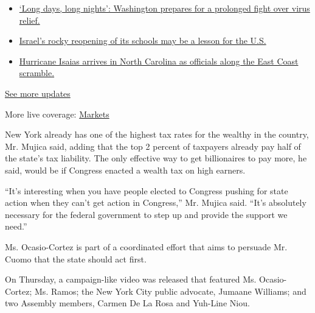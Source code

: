 \begin{itemize}
\tightlist
\item
  \href{https://www.nytimes.com/2020/08/04/world/coronavirus-covid-19.html?action=click\&pgtype=Article\&state=default\&region=MAIN_CONTENT_1\&context=storylines_live_updates\#link-6b644638}{`Long
  days, long nights': Washington prepares for a prolonged fight over
  virus relief.}
\item
  \href{https://www.nytimes.com/2020/08/04/world/coronavirus-covid-19.html?action=click\&pgtype=Article\&state=default\&region=MAIN_CONTENT_1\&context=storylines_live_updates\#link-7af9fca0}{Israel's
  rocky reopening of its schools may be a lesson for the U.S.}
\item
  \href{https://www.nytimes.com/2020/08/04/world/coronavirus-covid-19.html?action=click\&pgtype=Article\&state=default\&region=MAIN_CONTENT_1\&context=storylines_live_updates\#link-33bf9168}{Hurricane
  Isaias arrives in North Carolina as officials along the East Coast
  scramble.}
\end{itemize}

\href{https://www.nytimes.com/2020/08/04/world/coronavirus-covid-19.html?action=click\&pgtype=Article\&state=default\&region=MAIN_CONTENT_1\&context=storylines_live_updates}{See
more updates}

More live coverage:
\href{https://www.nytimes.com/live/2020/08/03/business/stock-market-today-coronavirus?action=click\&pgtype=Article\&state=default\&region=MAIN_CONTENT_1\&context=storylines_live_updates}{Markets}

New York already has one of the highest tax rates for the wealthy in the
country, Mr. Mujica said, adding that the top 2 percent of taxpayers
already pay half of the state's tax liability. The only effective way to
get billionaires to pay more, he said, would be if Congress enacted a
wealth tax on high earners.

``It's interesting when you have people elected to Congress pushing for
state action when they can't get action in Congress,'' Mr. Mujica said.
``It's absolutely necessary for the federal government to step up and
provide the support we need.''

Ms. Ocasio-Cortez is part of a coordinated effort that aims to persuade
Mr. Cuomo that the state should act first.

On Thursday, a campaign-like video was released that featured Ms.
Ocasio-Cortez; Ms. Ramos; the New York City public advocate, Jumaane
Williams; and two Assembly members, Carmen De La Rosa and Yuh-Line Niou.

